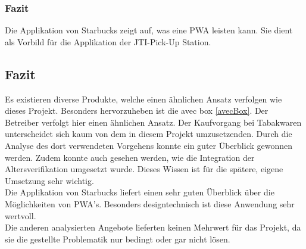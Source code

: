 \subsubsection{Fazit}
Die Applikation von Starbucks zeigt auf, was eine \gls{PWA} leisten kann. Sie dient als Vorbild für die Applikation der \ac{JTI}-Pick-Up Station. 


\subsection{Fazit}
Es existieren diverse Produkte, welche einen ähnlichen Ansatz verfolgen wie dieses Projekt. Besonders hervorzuheben ist die avec box \ref{avecBox}. Der Betreiber verfolgt hier einen ähnlichen Ansatz. 
Der Kaufvorgang bei Tabakwaren unterscheidet sich kaum von dem in diesem Projekt umzusetzenden. Durch die Analyse des dort verwendeten Vorgehens konnte ein guter Überblick gewonnen werden. Zudem konnte auch gesehen werden, wie die Integration der Altersverifikation umgesetzt wurde. Dieses Wissen ist für die spätere, eigene Umsetzung sehr wichtig. \\
Die Applikation von Starbucks liefert einen sehr guten Überblick über die Möglichkeiten von \gls{PWA}'s. Besonders designtechnisch ist diese Anwendung sehr wertvoll.\\
Die anderen analysierten Angebote lieferten keinen Mehrwert für das Projekt, da sie die gestellte Problematik nur bedingt oder gar nicht lösen.  

\newpage 